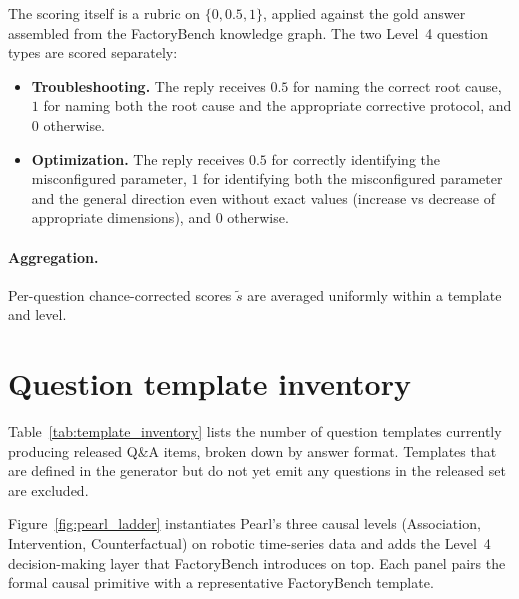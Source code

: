 \documentclass{article}
\begin{document}
The scoring itself is a rubric on $\{0, 0.5, 1\}$, applied against the gold answer assembled from the FactoryBench knowledge graph. The two Level~4 question types are scored separately:

\begin{itemize}
    \item \textbf{Troubleshooting.} The reply receives $0.5$ for naming the correct root cause, $1$ for naming both the root cause and the appropriate corrective protocol, and $0$ otherwise.
    \item \textbf{Optimization.} The reply receives $0.5$ for correctly identifying the misconfigured parameter, $1$ for identifying both the misconfigured parameter and the general direction even without exact values (increase vs decrease of appropriate dimensions), and $0$ otherwise.
\end{itemize}

\paragraph{Aggregation.} Per-question chance-corrected scores $\tilde{s}$ are averaged uniformly within a template and level.

\section{Question template inventory}
\label{app:templates}
Table~\ref{tab:template_inventory} lists the number of question templates currently producing released Q\&A items, broken down by answer format. Templates that are defined in the generator but do not yet emit any questions in the released set are excluded.

Figure~\ref{fig:pearl_ladder} instantiates Pearl's three causal levels (Association, Intervention, Counterfactual) on robotic time-series data and adds the Level~4 decision-making layer that FactoryBench introduces on top. Each panel pairs the formal causal primitive with a representative FactoryBench template.
\end{document}
